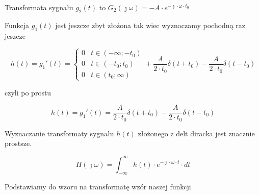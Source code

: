 \begin{task}
Transformata sygnału $g_2(t)$ to $G_2(\jmath \omega)=-A \cdot e^{-\jmath \cdot \omega \cdot t_0}$

Funkcja $g_1(t)$ jest jeszcze zbyt złożona tak wiec wyznaczamy pochodną raz jeszcze 

\begin{equation}
h(t)=g_1'(t)=\begin{cases}
0 & t \in \left( -\infty; -t_0 \right ) \\
0 & t \in \left( -t_0; t_0 \right ) \\
0 & t \in \left( t_0; \infty \right )
\end{cases} + \frac{A}{2\cdot t_0} \delta(t+t_0) - \frac{A}{2\cdot t_0} \delta(t-t_0)
\end{equation}

czyli po prostu

\begin{equation}
h(t)=g_1'(t)= \frac{A}{2\cdot t_0} \delta(t+t_0) - \frac{A}{2\cdot t_0} \delta(t-t_0)
\end{equation}

\begin{figure}[H]
  \centering
\end{figure}

Wyznaczanie transformaty sygnału $h(t)$ złożonego z delt diracka jest znacznie prostsze. 

\begin{equation}
H(\jmath \omega )=\int_{-\infty }^{\infty}h(t) \cdot e^{-\jmath \cdot \omega \cdot t}\cdot dt
\end{equation}

Podstawiamy do wzoru na transformatę wzór naszej funkcji


\end{task}

